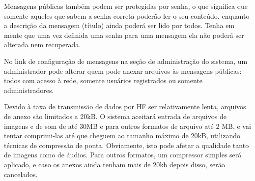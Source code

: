 \documentclass[11pt,a4paper]{article}
\begin{document}
Mensagens públicas também podem ser protegidas por senha, o que significa que somente aqueles que sabem a senha correta poderão ler o seu conteúdo. enquanto a descrição da mensagem (título) ainda poderá ser lido por todos. Tenha em mente que uma vez definida uma senha para uma mensagem ela não poderá ser alterada nem recuperada. 


No link de configuração de mensagens na seção de administração do sistema, um administrador pode alterar quem pode anexar arquivos às mensagens públicas: todos com acesso à rede, somente usuários registrados ou somente administradores.


Devido à taxa de transmissão de dados por HF ser relativamente lenta, arquivos de anexo são limitados a 20kB. O sistema aceitará entrada de arquivos de imagens e de som de até 30MB e para outros formatos de arquivo até 2 MB, e vai tentar comprimi-las até que cheguem ao tamanho máximo de 20kB, utilizando técnicas de compressão de ponta. Obviamente, isto pode afetar a qualidade tanto de imagens como de áudios. Para outros formatos, um compressor simples será aplicado, e caso os anexos ainda tenham mais de 20kb depois disso, serão cancelados.

\end{document}
